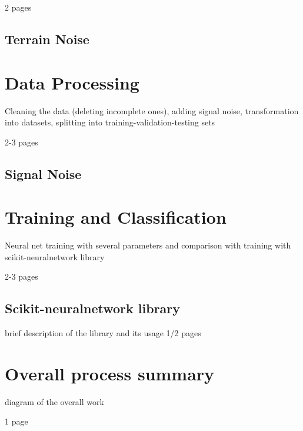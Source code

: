2 pages
\subsection{Terrain Noise}

\section{Data Processing}
Cleaning the data (deleting incomplete ones), adding signal noise, transformation into datasets, splitting into training-validation-testing sets

2-3 pages
\subsection{Signal Noise}

\section{Training and Classification}

Neural net training with several parameters and comparison with training with scikit-neuralnetwork library

2-3 pages

\subsection{Scikit-neuralnetwork library}
brief description of the library and its usage 1/2 pages

\section{Overall process summary}
diagram of the overall work

1 page